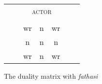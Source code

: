\begin{figure}
\centering
	\begin{tabularx}{\textwidth}{|ccccccc|}
		\cline{3-5}
		\multicolumn{2}{c|}{}&\multicolumn{3}{c|}{\textsc{actor}}&\\\cline{3-5}
		\multicolumn{2}{c|}{}&\multicolumn{1}{c}{\Sg}&\multicolumn{1}{|c|}{\Du}&\multicolumn{1}{c|}{\Pl}&\\\cline{1-5}
		{\parbox[t]{2mm}{}}&\multicolumn{1}{|c|}{\parbox[t]{2mm}{}}&\multicolumn{1}{c}{\multirow{2}{*}{\hspace{0,1cm}wr\hspace{0,1cm}}}	&\multirow{2}{*}{\hspace{0,1cm}n\hspace{0,1cm}}	&\multicolumn{1}{c|}{\multirow{2}{*}{\hspace{0,1cm}wr\hspace{0,1cm}}}&\\
		&\multicolumn{1}{|c|}{}&&&\multicolumn{1}{c|}{}\\\cline{2-2}
		&\multicolumn{1}{|c|}{\parbox[t]{2mm}{}}&\multicolumn{1}{c}{\multirow{2}{*}{\hspace{0,1cm}n\hspace{0,1cm}}}&\multirow{2}{*}{\hspace{0,1cm}n\hspace{0,1cm}}&\multicolumn{1}{c|}{\multirow{2}{*}{\hspace{0,1cm}n\hspace{0,1cm}}}&\\
		&\multicolumn{1}{|c|}{}&&&\multicolumn{1}{c|}{}\\\cline{2-2}
		&\multicolumn{1}{|c|}{\parbox[t]{2mm}{}}&\multicolumn{1}{c}{\multirow{2}{*}{\hspace{0,1cm}wr\hspace{0,1cm}}}&\multirow{2}{*}{\hspace{0,1cm}n\hspace{0,1cm}}&\multicolumn{1}{c|}{\multirow{2}{*}{\hspace{0,1cm}wr\hspace{0,1cm}}}&\\
		&\multicolumn{1}{|c|}{}&&&\multicolumn{1}{c|}{}\\\cline{1-5}
	\end{tabularx}
\caption{The duality matrix with \emph{fathasi}}
\label{dualitymatrixfathasi}
\end{figure}%

